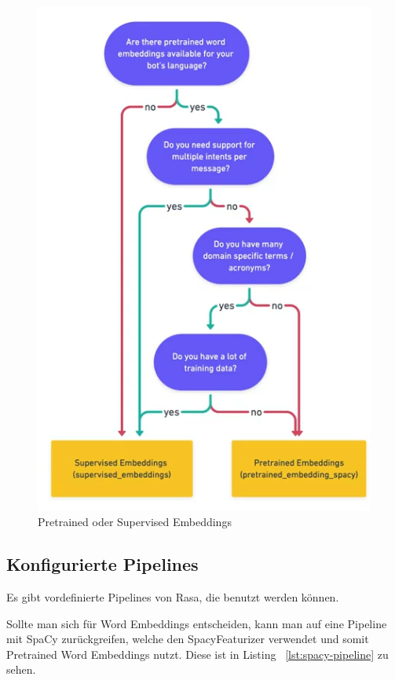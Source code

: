\begin{figure}[hbt!]
    \centering
    \includegraphics[scale=0.5]{pics/pre-trained-vs-supervised}
    \caption{Pretrained oder Supervised Embeddings~\cite{pretrainedVsSupervised, rasaMasterclassPreConfiguredPipelines}}
    \label{fig:pre_trained_vs_supervised}
\end{figure}

\subsection{Konfigurierte Pipelines}\label{subsec:configured-pipelines}

Es gibt vordefinierte Pipelines von Rasa, die benutzt werden können.

Sollte man sich für Word Embeddings entscheiden, kann man auf eine Pipeline mit SpaCy zurückgreifen, welche den SpacyFeaturizer verwendet und somit Pretrained Word Embeddings nutzt.
Diese ist in Listing ~\ref{lst:spacy-pipeline} zu sehen.\cite{startingPipelines, allComponents}

